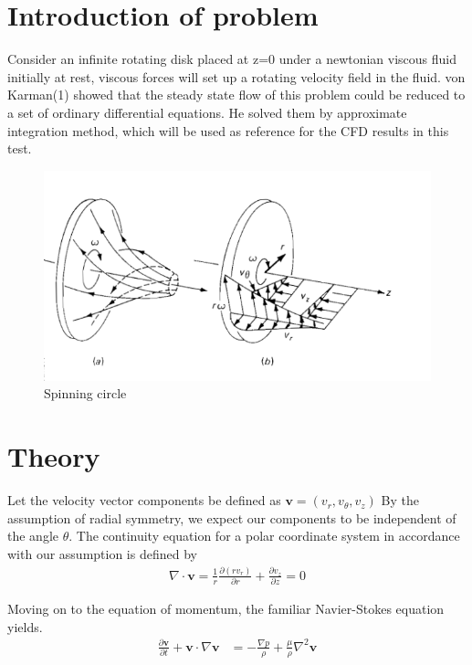 \documentclass[a4paper,norsk]{article}
\begin{document}
\maketitle

\section*{Introduction of problem}
Consider an infinite rotating disk placed at z=0 under a newtonian viscous fluid initially at rest,
viscous forces will set up a rotating velocity field in the fluid. von Karman(1) showed that the steady state flow
of this problem could be reduced to a set of ordinary differential equations. He solved them by
approximate integration method, which will be used as reference for the CFD results in this test.

\begin{figure}[h!]
	\centering
	\caption*{Spinning circle}
	\includegraphics[scale=0.6]{VonKarman.png}
\end{figure}

\section*{Theory}
Let the velocity vector components be defined as $\textbf{v} = (v_r, v_\theta, v_z)$
By the assumption of radial symmetry, we expect our components to be independent of the angle \textbf{$\theta$}.
The continuity equation for a polar coordinate system in accordance with our assumption is defined by
\begin{align}
\nabla \cdot \textbf{v} = \frac{1}{r} \frac{\partial(r v_r)}{\partial r} +
                        \frac{\partial v_z}{\partial z} = 0
\end{align}

Moving on to the equation of momentum, the familiar Navier-Stokes equation yields.
\begin{align}
\frac{\partial \textbf{v}}{\partial t} + \textbf{v} \cdot \nabla \textbf{v} &=
-\frac{\nabla p}{\rho} + \frac{\mu}{\rho} \nabla^2 \textbf{v}
\end{align}
\end{document}
